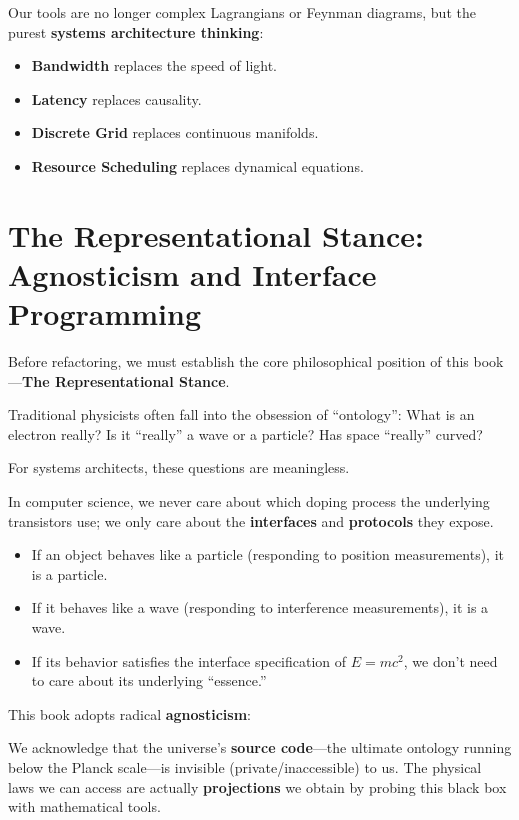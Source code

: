 Our tools are no longer complex Lagrangians or Feynman diagrams, but the purest \textbf{systems architecture thinking}:

\begin{itemize}
\item \textbf{Bandwidth} replaces the speed of light.

\item \textbf{Latency} replaces causality.

\item \textbf{Discrete Grid} replaces continuous manifolds.

\item \textbf{Resource Scheduling} replaces dynamical equations.
\end{itemize}

\section{The Representational Stance: Agnosticism and Interface Programming}

Before refactoring, we must establish the core philosophical position of this book---\textbf{The Representational Stance}.

Traditional physicists often fall into the obsession of ``ontology'': What is an electron really? Is it ``really'' a wave or a particle? Has space ``really'' curved?

For systems architects, these questions are meaningless.

In computer science, we never care about which doping process the underlying transistors use; we only care about the \textbf{interfaces} and \textbf{protocols} they expose.

\begin{itemize}
\item If an object behaves like a particle (responding to position measurements), it is a particle.

\item If it behaves like a wave (responding to interference measurements), it is a wave.

\item If its behavior satisfies the interface specification of $E=mc^2$, we don't need to care about its underlying ``essence.''
\end{itemize}

This book adopts radical \textbf{agnosticism}:

We acknowledge that the universe's \textbf{source code}---the ultimate ontology running below the Planck scale---is invisible (private/inaccessible) to us. The physical laws we can access are actually \textbf{projections} we obtain by probing this black box with mathematical tools.

